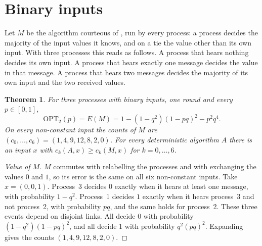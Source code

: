 \documentclass[11pt]{article}
\newtheorem{theorem}{Theorem}
\theoremstyle{remark}
\newcommand{\OPT}{\mathrm{OPT}}
\begin{document}
\section{Binary inputs}\label{sec:binary}

Let $M$ be the algorithm courteous of \cite{FPR26}, run by every process: a process decides the majority of the input values it knows, and on a tie the value other than its own input. With three processes this reads as follows. A process that hears nothing decides its own input. A process that hears exactly one message decides the value in that message. A process that hears two messages decides the majority of its own input and the two received values.

\begin{theorem}\label{thm:binary}
For three processes with binary inputs, one round and every $p\in[0,1]$,
\[
\OPT_2(p)=E(M)=1-(1-q^2)(1-pq)^2-p^2q^4 .
\]
On every non-constant input the counts of $M$ are $(c_0,\dots,c_6)=(1,4,9,12,8,2,0)$. For every deterministic algorithm $A$ there is an input $x$ with $c_k(A,x)\ge c_k(M,x)$ for $k=0,\dots,6$.
\end{theorem}

\begin{proof}[Value of $M$]
$M$ commutes with relabelling the processes and with exchanging the values $0$ and $1$, so its error is the same on all six non-constant inputs. Take $x=(0,0,1)$. Process~3 decides $0$ exactly when it hears at least one message, with probability $1-q^2$. Process~1 decides $1$ exactly when it hears process~3 and not process~2, with probability $pq$, and the same holds for process~2. These three events depend on disjoint links. All decide $0$ with probability $(1-q^2)(1-pq)^2$, and all decide $1$ with probability $q^2(pq)^2$. Expanding gives the counts $(1,4,9,12,8,2,0)$.
\end{proof}
\end{document}
